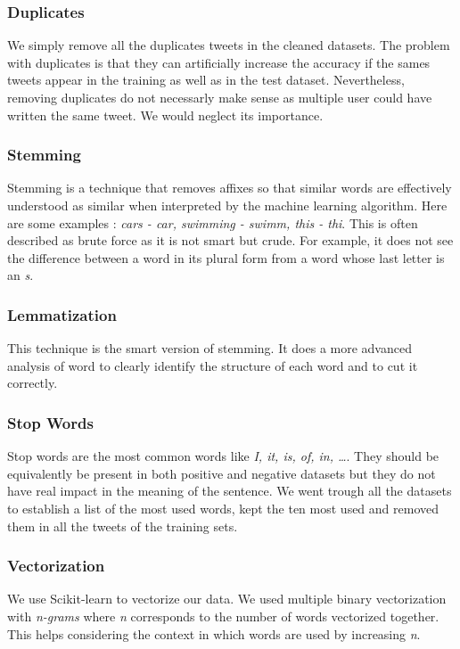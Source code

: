 \documentclass[11pt, a4paper, twocolumn]{article}
\begin{document}
\subsubsection{Duplicates}
We simply remove all the duplicates tweets in the cleaned datasets. The problem with duplicates is that they can artificially increase the accuracy if the sames tweets appear in the training as well as in the test dataset. Nevertheless, removing duplicates do not necessarly make sense as multiple user could have written the same tweet. We would neglect its importance.

\subsubsection{Stemming}
Stemming is a technique that removes affixes so that similar words are effectively understood as similar when interpreted by the machine learning algorithm. Here are some examples : \textit{cars - car, swimming - swimm, this - thi}. This is often described as brute force as it is not smart but crude. For example, it does not see the difference between a word in its plural form from a word whose last letter is an \textit{s}.

\subsubsection{Lemmatization}
This technique is the smart version of stemming. It does a more advanced analysis of word to clearly identify the structure of each word and to cut it correctly.

\subsubsection{Stop Words}
Stop words are the most common words like \textit{I, it, is, of, in, \dots}. They should be equivalently be present in both positive and negative datasets but they do not have real impact in the meaning of the sentence. We went trough all the datasets to establish a list of the most used words, kept the ten most used and removed them in all the tweets of the training sets.

\subsubsection{Vectorization}
We use Scikit-learn to vectorize our data. We used multiple binary vectorization with \textit{n-grams} where \textit{n} corresponds to the number of words vectorized together. This helps considering the context in which words are used by increasing \textit{n}.
\end{document}
